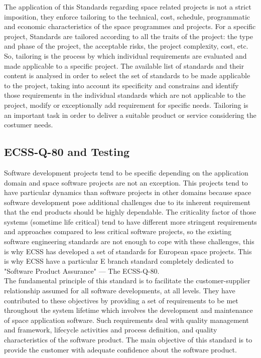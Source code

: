 {The application of this Standards regarding space related projects is not a strict imposition, they enforce
tailoring to the technical, cost, schedule, programmatic and economic characteristics of the space programmes and projects.
For a specific project, Standards are tailored according to all the traits of the project: the type and 
phase of the project, the acceptable risks, the project complexity, cost, etc.
So, tailoring is the process by which individual requirements are evaluated and made applicable to a specific project.
The available list of standards and their content is analysed in order to select the set of standards to be made applicable to the project, taking 
into account its specificity and constrains and identify those requirements in the individual standards which are not 
applicable to the project, modify or exceptionally add requirement for specific needs\cite{ecss-s-st-00c}.
Tailoring is an important task in order to deliver a suitable product or service considering the costumer needs.

\subsection{ECSS-Q-80 and Testing}
Software development projects tend to be specific depending on the application domain and 
space software projects are not an exception. This projects tend to have particular dynamics than software projects
in other domains because space software development pose additional challenges due to its inherent
requirement that the end products should be highly dependable.
The criticality factor of those systems (sometime life critical) tend to have different more stringent requirements and approaches 
compared to less critical software projects, so
the existing software engineering standards are not enough to cope with these challenges, this is why \ac{ECSS} has developed a set of standards for European
space projects\cite{Ahmad2010AgileECSS,10.1109/SESS.1997.595952}.
This is why \ac{ECSS} have a particular E branch standard completely dedicated to "Software Product Assurance" --- The ECSS-Q-80\cite{ecss-q-st-80c}.\\

The fundamental principle of this standard is to facilitate the
customer-supplier relationship assumed for all software developments, at all levels.
They have contributed to these objectives by providing a set of requirements to be
met throughout the system lifetime which involves the development and
maintenance of space application software. Such requirements deal with quality
management and framework, lifecycle activities and process definition, and quality
characteristics of the software product\cite{Mattiello-FranciscoSanAmbJogCos:2007:BrSoIn}.
The main objective of this standard is to provide the customer with adequate confidence about the software product.

}
